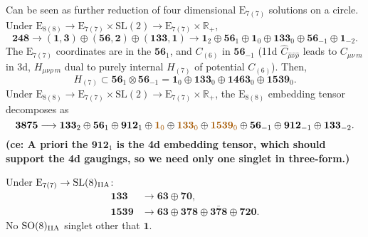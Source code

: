 \documentclass[11pt]{article}
\newcommand{\SO}{\ensuremath{\mathrm{SO}}\xspace}
\newcommand{\SL}{\ensuremath{\mathrm{SL}}\xspace}
\newcommand{\E}{\ensuremath{\mathrm{E}}\xspace}
\newcommand{\R}{\ensuremath{\mathbb{R}}\xspace}
\newcommand{\ce}[1]{\marginpar{\parbox{\marginparwidth}{\boldmath $\Longleftarrow$}}
{\boldmath\bfseries (ce: #1)}}
\begin{document}
Can be seen as further reduction of four dimensional $\E_{7(7)}$ solutions on a circle. Under $\E_{8(8)}\rightarrow\E_{7(7)}\times\SL(2)\rightarrow\E_{7(7)}\times\R_{+}$,
\begin{equation}
  \bm{248} \longrightarrow (\bm{1},\bm{3}) \oplus (\bm{56},\bm{2}) \oplus (\bm{133},\bm{1})\longrightarrow \bm{1}_{2} \oplus \bm{56}_{1} \oplus \bm{1}_{0} \oplus \bm{133}_{0} \oplus \bm{56}_{-1} \oplus \bm{1}_{-2}.
\end{equation}
The $\E_{7(7)}$ coordinates are in the $\bm{56}_{1}$, and $C_{(6)}$ in $\bm{56}_{-1}$ (11d $\hat{C}_{\hat\mu\hat\nu\hat\rho}$ leads to $C_{\mu\nu\,m}$ in 3d, $H_{\mu\nu\rho\,m}$ dual to purely internal $H_{(7)}$ of potential $C_{(6)}$). Then,
\begin{equation}
    H_{(7)} \subset \bm{56}_{1} \otimes \bm{56}_{-1} = \bm{1}_{0} \oplus \bm{133}_{0} \oplus \bm{1463}_{0} \oplus \bm{1539}_{0}.
\end{equation}
Under $\E_{8(8)}\rightarrow\E_{7(7)}\times\SL(2)\rightarrow\E_{7(7)}\times\R_{+}$, the $\E_{8(8)}$ embedding tensor decomposes as
\begin{equation}
    \bm{3875} \longrightarrow \bm{133}_{2} \oplus \bm{56}_{1} \oplus \bm{912}_{1} \oplus {\color{mydarkorange}\bm{1}_{0}} \oplus {\color{mydarkorange}\bm{133}_{0}} \oplus {\color{mydarkorange}\bm{1539}_{0}} \oplus \bm{56}_{-1} \oplus \bm{912}_{-1} \oplus \bm{133}_{-2}.
\end{equation}
\ce{A priori the $\bm{912}_{1}$ is the 4d embedding tensor, which should support the 4d gaugings, so we need only one singlet in three-form.}

Under $\E_{7(7)}\rightarrow\SL(8)_{\rm IIA}$:
\begin{equation}
  \begin{aligned}
    \bm{133} & \longrightarrow \bm{63} \oplus \bm{70},\\
    \bm{1539} & \longrightarrow \bm{63} \oplus \bm{378} \oplus \bm{\bar{378}} \oplus \bm{720}.
  \end{aligned}
\end{equation}
No $\SO(8)_{\rm IIA}$ singlet other that $\bm{1}$.

\end{document}
